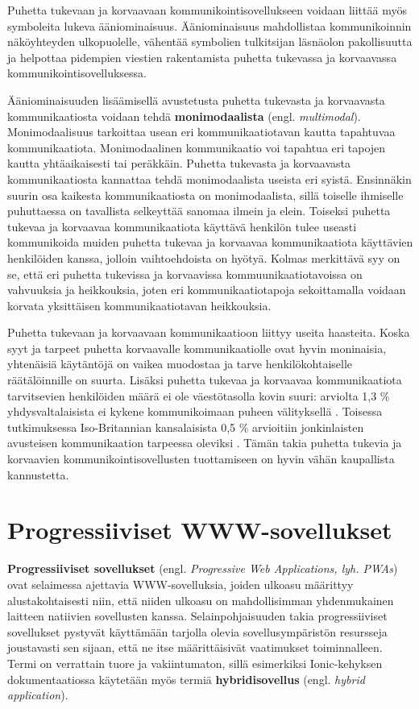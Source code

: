 \documentclass[utf8]{gradu3}
\begin{document}
Puhetta tukevaan ja korvaavaan kommunikointisovellukseen voidaan liittää myös symboleita lukeva ääniominaisuus. Ääniominaisuus mahdollistaa kommunikoinnin näköyhteyden ulkopuolelle, vähentää symbolien tulkitsijan läsnäolon pakollisuutta ja helpottaa pidempien viestien rakentamista puhetta tukevassa ja korvaavassa kommunikointisovelluksessa. \parencite[]{AAC-interventions}

Ääniominaisuuden lisäämisellä avustetusta puhetta tukevasta ja korvaavasta kommunikaatiosta voidaan tehdä \textbf{monimodaalista} (engl. \textit{multimodal}). Monimodaalisuus tarkoittaa usean eri kommunikaatiotavan kautta tapahtuvaa kommunikaatiota. Monimodaalinen kommunikaatio voi tapahtua eri tapojen kautta yhtäaikaisesti tai peräkkäin. Puhetta tukevasta ja korvaavasta kommunikaatiosta kannattaa tehdä monimodaalista useista eri syistä. Ensinnäkin suurin osa kaikesta kommunikaatiosta on monimodaalista, sillä toiselle ihmiselle puhuttaessa on tavallista selkeyttää sanomaa ilmein ja elein. Toiseksi puhetta tukevaa ja korvaavaa kommunikaatiota käyttävä henkilön tulee useasti kommunikoida muiden puhetta tukevaa ja korvaavaa kommunikaatiota käyttävien henkilöiden kanssa, jolloin vaihtoehdoista on hyötyä. Kolmas merkittävä syy on se, että eri puhetta tukevissa ja korvaavissa kommuunikaatiotavoissa on vahvuuksia ja heikkouksia, joten eri kommunikaatiotapoja sekoittamalla voidaan korvata yksittäisen kommunikaatiotavan heikkouksia. \parencite[]{AAC-conditional-use}

Puhetta tukevaan ja korvaavaan kommunikaatioon liittyy useita haasteita. Koska syyt ja tarpeet puhetta korvaavalle kommunikaatiolle ovat hyvin moninaisia, yhtenäisiä käytäntöjä on vaikea muodostaa ja tarve henkilökohtaiselle räätälöinnille on suurta. Lisäksi puhetta tukevaa ja korvaavaa kommunikaatiota tarvitsevien henkilöiden määrä ei ole väestötasolla kovin suuri: arviolta 1,3 \% yhdysvaltalaisista ei kykene kommunikoimaan puheen välityksellä \parencite[]{AAC-support}. Toisessa tutkimuksessa Iso-Britannian kansalaisista 0,5 \% arvioitiin jonkinlaisten avusteisen kommunikaation tarpeessa oleviksi \parencite[]{AAC-need}. Tämän takia puhetta tukevia ja korvaavien kommunikointisovellusten tuottamiseen on hyvin vähän kaupallista kannustetta.

\section{Progressiiviset WWW-sovellukset}

\textbf{Progressiiviset sovellukset} (engl. \textit{Progressive Web Applications, lyh. PWAs}) ovat selaimessa ajettavia WWW-sovelluksia, joiden ulkoasu määrittyy alustakohtaisesti niin, että niiden ulkoasu on mahdollisimman yhdenmukainen laitteen natiivien sovellusten kanssa. Selainpohjaisuuden takia progressiiviset sovellukset pystyvät käyttämään tarjolla olevia sovellusympäristön resursseja joustavasti sen sijaan, että ne itse määrittäisivät vaatimukset toiminnalleen. Termi on verrattain tuore ja vakiintumaton, sillä esimerkiksi Ionic-kehyksen dokumentaatiossa käytetään myös termiä \textbf{hybridisovellus} (engl. \textit{hybrid application}).
\end{document}
